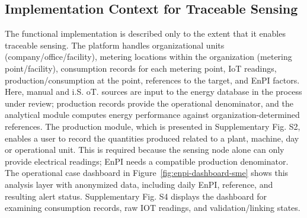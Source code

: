 \documentclass[technologies,article,submit,pdftex,moreauthors]{Definitions/mdpi}
\begin{document}
\subsection{Implementation Context for Traceable Sensing}
\label{sec:functional-implementation}

The functional implementation is described only to the extent that it enables traceable sensing. The platform handles organizational units (company/office/facility), metering locations within the organization (metering point/facility), consumption records for each metering point, IoT readings, production/consumption at the point, references to the target, and EnPI factors. Here, manual and i.S. oT. sources are input to the energy database in the process under review; production records provide the operational denominator, and the analytical module computes energy performance against organization-determined references. The production module, which is presented in Supplementary Fig. S2, enables a user to record the quantities produced related to a plant, machine, day or operational unit. This is required because the sensing node alone can only provide electrical readings; EnPI needs a compatible production denominator. 
The operational case dashboard in Figure~\ref{fig:enpi-dashboard-sme} shows this analysis layer with anonymized data, including daily EnPI, reference, and resulting alert status. Supplementary Fig. S4 displays the dashboard for examining consumption records, raw IOT readings, and validation/linking states. 
\end{document}
